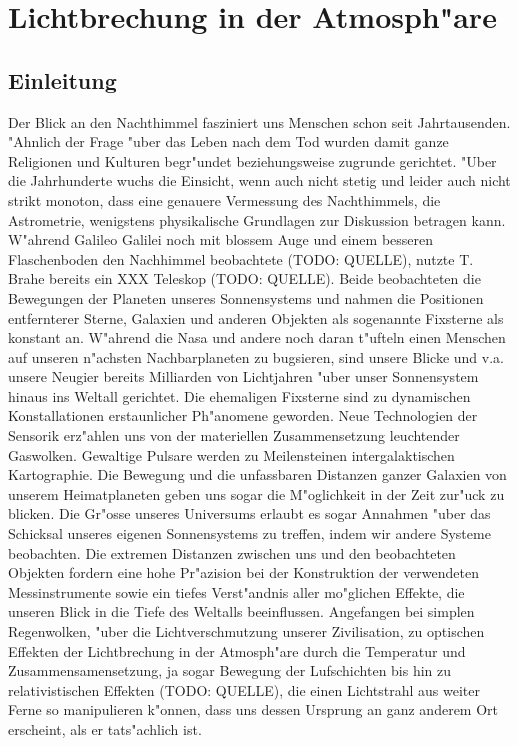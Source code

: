 \chapter{Lichtbrechung in der Atmosph"are\label{chapter:licht}}
\begin{refsection}


\section{Einleitung}
Der Blick an den Nachthimmel fasziniert uns Menschen schon seit Jahrtausenden. "Ahnlich der Frage "uber das Leben nach dem Tod wurden damit ganze Religionen und Kulturen begr"undet beziehungsweise zugrunde gerichtet. 
"Uber die Jahrhunderte wuchs die Einsicht, wenn auch nicht stetig und leider auch nicht strikt monoton, dass eine genauere Vermessung des Nachthimmels, die Astrometrie, wenigstens physikalische Grundlagen zur Diskussion betragen kann. 
W"ahrend Galileo Galilei noch mit blossem Auge und einem besseren Flaschenboden den Nachhimmel beobachtete (TODO: QUELLE), nutzte T. Brahe bereits ein XXX Teleskop (TODO: QUELLE). 
Beide beobachteten die Bewegungen der Planeten unseres Sonnensystems und nahmen die Positionen entfernterer Sterne, Galaxien und anderen Objekten als sogenannte Fixsterne als konstant an. 
W"ahrend die Nasa und andere noch daran t"ufteln einen Menschen auf unseren n"achsten Nachbarplaneten zu bugsieren, sind unsere Blicke und v.a. unsere Neugier bereits Milliarden von Lichtjahren "uber unser Sonnensystem hinaus ins Weltall gerichtet. 
Die ehemaligen Fixsterne sind zu dynamischen Konstallationen erstaunlicher Ph"anomene geworden.
Neue Technologien der Sensorik erz"ahlen uns von der materiellen Zusammensetzung leuchtender Gaswolken. 
Gewaltige Pulsare werden zu Meilensteinen intergalaktischen Kartographie. 
Die Bewegung und die unfassbaren Distanzen ganzer Galaxien von unserem Heimatplaneten geben uns sogar die M"oglichkeit in der Zeit zur"uck zu blicken.
Die Gr"osse unseres Universums  erlaubt es sogar Annahmen "uber das Schicksal unseres eigenen Sonnensystems zu treffen, indem wir andere Systeme beobachten. 
Die extremen Distanzen zwischen uns und den beobachteten Objekten fordern eine hohe Pr"azision bei der Konstruktion der verwendeten Messinstrumente sowie ein tiefes Verst"andnis aller mo"glichen Effekte, die unseren Blick in die Tiefe des Weltalls beeinflussen. 
Angefangen bei simplen Regenwolken, "uber die Lichtverschmutzung unserer Zivilisation, zu optischen Effekten der Lichtbrechung in der Atmosph"are durch die Temperatur und Zusammensamensetzung, ja sogar Bewegung der Lufschichten bis hin zu relativistischen Effekten (TODO: QUELLE), die einen Lichtstrahl aus weiter Ferne so manipulieren k"onnen, dass uns dessen Ursprung an ganz anderem Ort erscheint, als er tats"achlich ist. 

\end{refsection}
